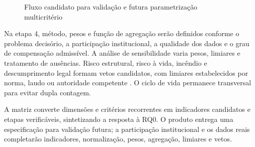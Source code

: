 \begin{figure}[htbp]
\centering
{}
\caption{Fluxo candidato para validação e futura parametrização multicritério}
\label{fig:fluxoprotocolo}
\end{figure}

Na etapa 4, método, pesos e função de agregação serão definidos conforme o problema decisório, a participação institucional, a qualidade dos dados e o grau de compensação admissível. A análise de sensibilidade varia pesos, limiares e tratamento de ausências. Risco estrutural, risco à vida, incêndio e descumprimento legal formam vetos candidatos, com limiares estabelecidos por norma, laudo ou autoridade competente \parencite{abnt_nbr5674_2012,araujoneto_manutencaolegislacao_2015}. O ciclo de vida permanece transversal para evitar dupla contagem.

A matriz converte dimensões e critérios recorrentes em indicadores candidatos e etapas verificáveis, sintetizando a resposta à RQ0. O produto entrega uma especificação para validação futura; a participação institucional e os dados reais completarão indicadores, normalização, pesos, agregação, limiares e vetos.
